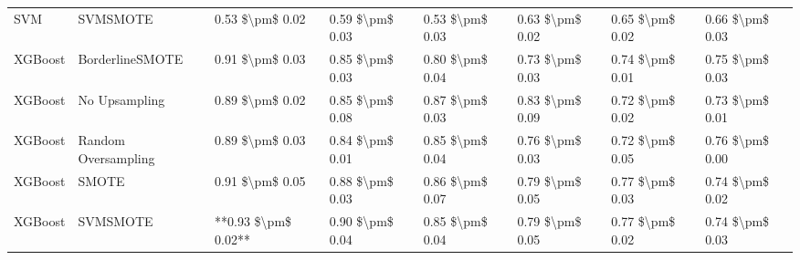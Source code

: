 \begin{tabular}{llllllll}
                            SVM &                      SVMSMOTE &     0.53 \$\textbackslash pm\$ 0.02 &           0.59 \$\textbackslash pm\$ 0.03 &       0.53 \$\textbackslash pm\$ 0.03 &        0.63 \$\textbackslash pm\$ 0.02 &                         0.65 \$\textbackslash pm\$ 0.02 & 0.66 \$\textbackslash pm\$ 0.03 \\
                        XGBoost &               BorderlineSMOTE &     0.91 \$\textbackslash pm\$ 0.03 &           0.85 \$\textbackslash pm\$ 0.03 &       0.80 \$\textbackslash pm\$ 0.04 &        0.73 \$\textbackslash pm\$ 0.03 &                         0.74 \$\textbackslash pm\$ 0.01 & 0.75 \$\textbackslash pm\$ 0.03 \\
                        XGBoost &                 No Upsampling &     0.89 \$\textbackslash pm\$ 0.02 &           0.85 \$\textbackslash pm\$ 0.08 &       0.87 \$\textbackslash pm\$ 0.03 &        0.83 \$\textbackslash pm\$ 0.09 &                         0.72 \$\textbackslash pm\$ 0.02 & 0.73 \$\textbackslash pm\$ 0.01 \\
                        XGBoost &           Random Oversampling &     0.89 \$\textbackslash pm\$ 0.03 &           0.84 \$\textbackslash pm\$ 0.01 &       0.85 \$\textbackslash pm\$ 0.04 &        0.76 \$\textbackslash pm\$ 0.03 &                         0.72 \$\textbackslash pm\$ 0.05 & 0.76 \$\textbackslash pm\$ 0.00 \\
                        XGBoost &                         SMOTE &     0.91 \$\textbackslash pm\$ 0.05 &           0.88 \$\textbackslash pm\$ 0.03 &       0.86 \$\textbackslash pm\$ 0.07 &        0.79 \$\textbackslash pm\$ 0.05 &                         0.77 \$\textbackslash pm\$ 0.03 & 0.74 \$\textbackslash pm\$ 0.02 \\
                        XGBoost &                      SVMSMOTE & **0.93 \$\textbackslash pm\$ 0.02** &           0.90 \$\textbackslash pm\$ 0.04 &       0.85 \$\textbackslash pm\$ 0.04 &        0.79 \$\textbackslash pm\$ 0.05 &                         0.77 \$\textbackslash pm\$ 0.02 & 0.74 \$\textbackslash pm\$ 0.03 \\
\bottomrule
\end{tabular}
